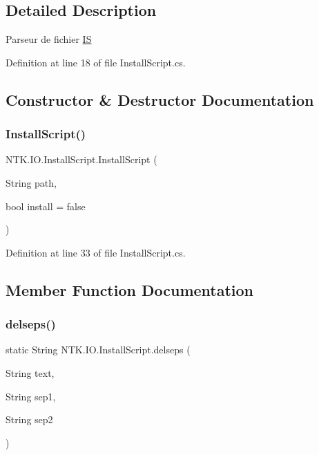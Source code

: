 \subsection{Detailed Description}
Parseur de fichier \mbox{\hyperlink{namespace_n_t_k_1_1_i_o_1_1_i_s}{IS}} 



Definition at line 18 of file Install\+Script.\+cs.



\subsection{Constructor \& Destructor Documentation}
\mbox{\label{class_n_t_k_1_1_i_o_1_1_install_script_ace111e02426ee37dd32b05817ab0d391}} 
\subsubsection{\texorpdfstring{InstallScript()}{InstallScript()}}
{\footnotesize\ttfamily N\+T\+K.\+I\+O.\+Install\+Script.\+Install\+Script (\begin{DoxyParamCaption}\item[{String}]{path,  }\item[{bool}]{install = {\ttfamily false} }\end{DoxyParamCaption})}



Definition at line 33 of file Install\+Script.\+cs.



\subsection{Member Function Documentation}
\mbox{\label{class_n_t_k_1_1_i_o_1_1_install_script_a7d5e0705e0212b34422131db484adea9}} 
\subsubsection{\texorpdfstring{delseps()}{delseps()}}
{\footnotesize\ttfamily static String N\+T\+K.\+I\+O.\+Install\+Script.\+delseps (\begin{DoxyParamCaption}\item[{String}]{text,  }\item[{String}]{sep1,  }\item[{String}]{sep2 }\end{DoxyParamCaption})\hspace{0.3cm}{\ttfamily [static]}}



